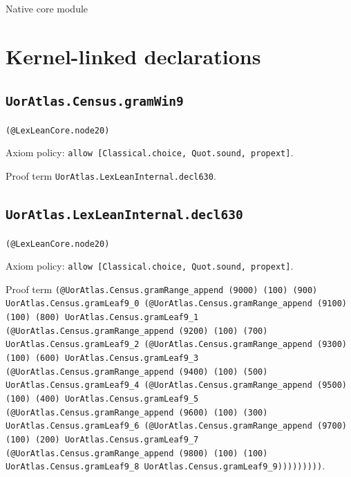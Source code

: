 \documentclass[11pt]{article}
\begin{document}
\begin{center}{\LARGE Native core module}\end{center}
\section*{Kernel-linked declarations}
\subsection*{\texttt{UorAtlas.Census.gramWin9}}
\noindent\texttt{(@LexLeanCore.node20)}\par
\noindent Axiom policy: \texttt{allow [Classical.choice, Quot.sound, propext]}.\par
\noindent Proof term \texttt{UorAtlas.LexLeanInternal.decl630}.\par
\subsection*{\texttt{UorAtlas.LexLeanInternal.decl630}}
\noindent\texttt{(@LexLeanCore.node20)}\par
\noindent Axiom policy: \texttt{allow [Classical.choice, Quot.sound, propext]}.\par
\noindent Proof term \texttt{(@UorAtlas.Census.gramRange\_append (9000) (100) (900) UorAtlas.Census.gramLeaf9\_0 (@UorAtlas.Census.gramRange\_append (9100) (100) (800) UorAtlas.Census.gramLeaf9\_1 (@UorAtlas.Census.gramRange\_append (9200) (100) (700) UorAtlas.Census.gramLeaf9\_2 (@UorAtlas.Census.gramRange\_append (9300) (100) (600) UorAtlas.Census.gramLeaf9\_3 (@UorAtlas.Census.gramRange\_append (9400) (100) (500) UorAtlas.Census.gramLeaf9\_4 (@UorAtlas.Census.gramRange\_append (9500) (100) (400) UorAtlas.Census.gramLeaf9\_5 (@UorAtlas.Census.gramRange\_append (9600) (100) (300) UorAtlas.Census.gramLeaf9\_6 (@UorAtlas.Census.gramRange\_append (9700) (100) (200) UorAtlas.Census.gramLeaf9\_7 (@UorAtlas.Census.gramRange\_append (9800) (100) (100) UorAtlas.Census.gramLeaf9\_8 UorAtlas.Census.gramLeaf9\_9)))))))))}.\par
\end{document}
